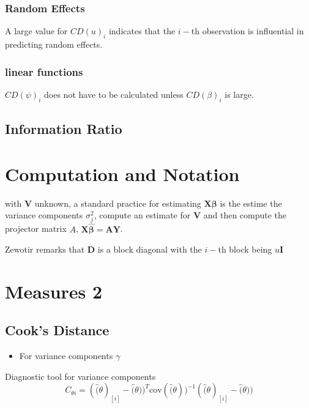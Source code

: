 \documentclass[Main.tex]{subfiles}
\begin{document}
	
	\newpage
	\subsubsection{Random Effects}
	
	A large value for $CD(u)_i$ indicates that the $i-$th observation is influential in predicting random effects.
	
	\subsubsection{linear functions}
	
	$CD(\psi)_i$ does not have to be calculated unless $CD(\beta)_i$ is large.
	
	
	\subsection{Information Ratio}
	
	
	\newpage
	\section{Computation and Notation } %
	with $\boldsymbol{V}$ unknown, a standard practice for estimating $\boldsymbol{X \beta}$ is the estime the variance components $\sigma^2_j$,
	compute an estimate for $\boldsymbol{V}$ and then compute the projector matrix $A$, $\boldsymbol{X \hat{\beta}}  = \boldsymbol{AY}$.
	
	
	Zewotir remarks that $\boldsymbol{D}$ is a block diagonal with the $i-$th block being $u \boldsymbol{I}$
	\newpage
	\section{Measures 2} %
	
	\subsection{Cook's Distance} %
	\begin{itemize}
		\item For variance components $\gamma$
	\end{itemize}
	
	Diagnostic tool for variance components
	\[ C_{\theta i} =(\hat(\theta)_{[i]} - \hat(\theta))^{T}\mbox{cov}( \hat(\theta))^{-1}(\hat(\theta)_{[i]} - \hat(\theta))\]
	
\end{document}
